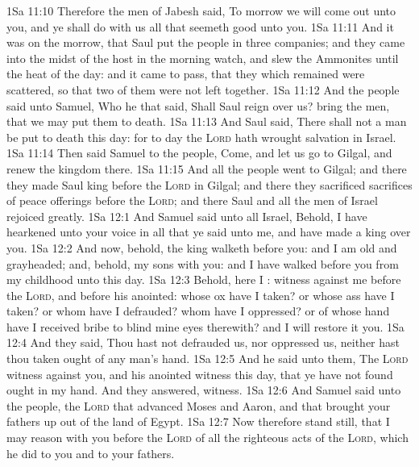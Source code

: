 \vs 1Sa 11:10 Therefore the men of Jabesh said, To morrow we will come out unto you, and ye shall do with us all that seemeth good unto you.
\vs 1Sa 11:11 And it was  on the morrow, that Saul put the people in three companies; and they came into the midst of the host in the morning watch, and slew the Ammonites until the heat of the day: and it came to pass, that they which remained were scattered, so that two of them were not left together.
\vs 1Sa 11:12 And the people said unto Samuel, Who  he that said, Shall Saul reign over us? bring the men, that we may put them to death.
\vs 1Sa 11:13 And Saul said, There shall not a man be put to death this day: for to day the \textsc{Lord} hath wrought salvation in Israel.
\vs 1Sa 11:14 Then said Samuel to the people, Come, and let us go to Gilgal, and renew the kingdom there.
\vs 1Sa 11:15 And all the people went to Gilgal; and there they made Saul king before the \textsc{Lord} in Gilgal; and there they sacrificed sacrifices of peace offerings before the \textsc{Lord}; and there Saul and all the men of Israel rejoiced greatly.
\vs 1Sa 12:1 And Samuel said unto all Israel, Behold, I have hearkened unto your voice in all that ye said unto me, and have made a king over you.
\vs 1Sa 12:2 And now, behold, the king walketh before you: and I am old and grayheaded; and, behold, my sons  with you: and I have walked before you from my childhood unto this day.
\vs 1Sa 12:3 Behold, here I : witness against me before the \textsc{Lord}, and before his anointed: whose ox have I taken? or whose ass have I taken? or whom have I defrauded? whom have I oppressed? or of whose hand have I received  bribe to blind mine eyes therewith? and I will restore it you.
\vs 1Sa 12:4 And they said, Thou hast not defrauded us, nor oppressed us, neither hast thou taken ought of any man's hand.
\vs 1Sa 12:5 And he said unto them, The \textsc{Lord}  witness against you, and his anointed  witness this day, that ye have not found ought in my hand. And they answered,  witness.
\vs 1Sa 12:6 And Samuel said unto the people,  the \textsc{Lord} that advanced Moses and Aaron, and that brought your fathers up out of the land of Egypt.
\vs 1Sa 12:7 Now therefore stand still, that I may reason with you before the \textsc{Lord} of all the righteous acts of the \textsc{Lord}, which he did to you and to your fathers.
